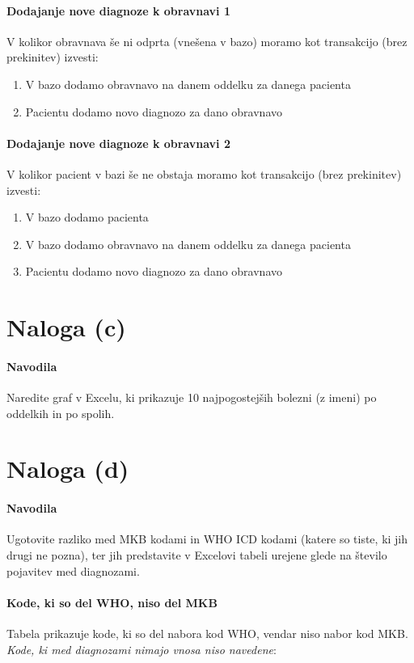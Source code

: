 \documentclass[a4paper,12pt]{report}
\begin{document}
\paragraph{Dodajanje nove diagnoze k obravnavi 1}
V kolikor obravnava še ni odprta (vnešena v bazo) moramo kot transakcijo (brez prekinitev) izvesti:
\begin{enumerate}
   \item V bazo dodamo obravnavo na danem oddelku za danega pacienta
   \item Pacientu dodamo novo diagnozo za dano obravnavo
\end{enumerate}

\paragraph{Dodajanje nove diagnoze k obravnavi 2}
V kolikor pacient v bazi še ne obstaja moramo kot transakcijo (brez prekinitev) izvesti:
\begin{enumerate}
   \item V bazo dodamo pacienta
   \item V bazo dodamo obravnavo na danem oddelku za danega pacienta
   \item Pacientu dodamo novo diagnozo za dano obravnavo
\end{enumerate}

\pagebreak
\section*{Naloga (c)}
\paragraph{Navodila}
Naredite graf v Excelu, ki prikazuje 10 najpogostejših bolezni (z imeni) po oddelkih in po spolih.


\section*{Naloga (d)}
\paragraph{Navodila}
Ugotovite razliko med MKB kodami in WHO ICD kodami (katere so tiste, ki jih drugi ne pozna), ter jih predstavite v Excelovi tabeli urejene glede na število pojavitev med diagnozami.

\pagebreak
\paragraph{Kode, ki so del WHO, niso del MKB}
Tabela prikazuje kode, ki so del nabora kod WHO, vendar niso nabor kod MKB. \textit{Kode, ki med diagnozami nimajo vnosa niso navedene}:
\end{document}
